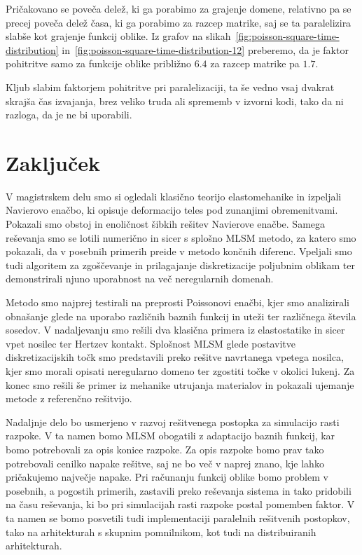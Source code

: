 \documentclass[12pt,a4paper,twoside]{article}
\theoremstyle{definition} %
\theoremstyle{plain} %
\numberwithin{equation}{section}
\let\oldsection\section
\def\section{\cleardoublepage\oldsection}
\begin{document}
Pričakovano se poveča delež, ki ga porabimo za grajenje domene, relativno pa se precej poveča delež
časa, ki ga porabimo za razcep matrike, saj se ta paralelizira slabše kot grajenje funkcij oblike.
Iz grafov na slikah~\ref{fig:poisson-square-time-distribution}
in~\ref{fig:poisson-square-time-distribution-12} preberemo, da je faktor pohitritve samo za funkcije
oblike približno $6.4$ za razcep matrike pa $1.7$.

Kljub slabim faktorjem pohitritve pri paralelizaciji, ta še vedno vsaj dvakrat skrajša čas izvajanja,
brez veliko truda ali sprememb v izvorni kodi, tako da ni razloga, da je ne bi uporabili.

\section{Zaključek}

V magistrskem delu smo si ogledali klasično teorijo elastomehanike in izpeljali Navierovo enačbo, ki
opisuje deformacijo teles pod zunanjimi obremenitvami. Pokazali smo obstoj in enoličnost šibkih
rešitev Navierove enačbe. Samega reševanja smo se lotili numerično in sicer s splošno MLSM metodo,
za katero smo pokazali, da v posebnih primerih preide v metodo končnih diferenc. Vpeljali smo tudi
algoritem za zgoščevanje in prilagajanje diskretizacije poljubnim oblikam ter demonstrirali njuno
uporabnost na več neregularnih domenah.

Metodo smo najprej testirali na preprosti Poissonovi enačbi, kjer smo analizirali obnašanje glede na
uporabo različnih baznih funkcij in uteži ter različnega števila sosedov. V nadaljevanju smo rešili
dva klasična primera iz elastostatike in sicer vpet nosilec ter Hertzev kontakt. Splošnost MLSM
glede postavitve diskretizacijskih točk smo predstavili preko rešitve navrtanega vpetega
nosilca, kjer smo morali opisati neregularno domeno ter zgostiti točke v okolici lukenj. Za konec
smo rešili še primer iz mehanike utrujanja materialov in pokazali ujemanje metode z referenčno
rešitvijo.

Nadaljnje delo bo usmerjeno v razvoj rešitvenega postopka za simulacijo rasti razpoke. V ta namen
bomo MLSM obogatili z adaptacijo baznih funkcij, kar bomo potrebovali za opis konice razpoke. Za
opis razpoke bomo prav tako potrebovali cenilko napake rešitve, saj ne bo več v naprej znano, kje
lahko pričakujemo največje napake. Pri računanju funkcij oblike bomo problem v posebnih, a pogostih
primerih, zastavili preko reševanja sistema in tako pridobili na času reševanja, ki bo pri
simulacijah rasti razpoke postal pomemben faktor. V ta namen se bomo posvetili tudi implementaciji
paralelnih rešitvenih postopkov, tako na arhitekturah s skupnim pomnilnikom, kot tudi na
distribuiranih arhitekturah.
\end{document}
